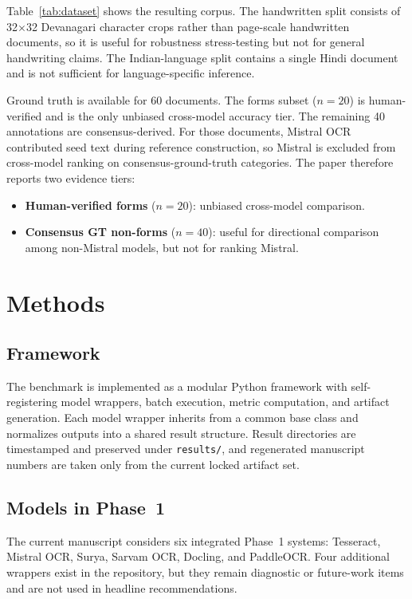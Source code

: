\documentclass[conference]{IEEEtran}
\begin{document}
Table~\ref{tab:dataset} shows the resulting corpus. The handwritten split consists of 32$\times$32 Devanagari character crops rather than page-scale handwritten documents, so it is useful for robustness stress-testing but not for general handwriting claims. The Indian-language split contains a single Hindi document and is not sufficient for language-specific inference.

Ground truth is available for 60 documents. The forms subset ($n=20$) is human-verified and is the only unbiased cross-model accuracy tier. The remaining 40 annotations are consensus-derived. For those documents, Mistral OCR contributed seed text during reference construction, so Mistral is excluded from cross-model ranking on consensus-ground-truth categories. The paper therefore reports two evidence tiers:
\begin{itemize}
    \item \textbf{Human-verified forms} ($n=20$): unbiased cross-model comparison.
    \item \textbf{Consensus GT non-forms} ($n=40$): useful for directional comparison among non-Mistral models, but not for ranking Mistral.
\end{itemize}

\section{Methods}

\subsection{Framework}

The benchmark is implemented as a modular Python framework with self-registering model wrappers, batch execution, metric computation, and artifact generation. Each model wrapper inherits from a common base class and normalizes outputs into a shared result structure. Result directories are timestamped and preserved under \texttt{results/}, and regenerated manuscript numbers are taken only from the current locked artifact set.

\subsection{Models in Phase~1}

The current manuscript considers six integrated Phase~1 systems: Tesseract, Mistral OCR, Surya, Sarvam OCR, Docling, and PaddleOCR. Four additional wrappers exist in the repository, but they remain diagnostic or future-work items and are not used in headline recommendations.
\end{document}
